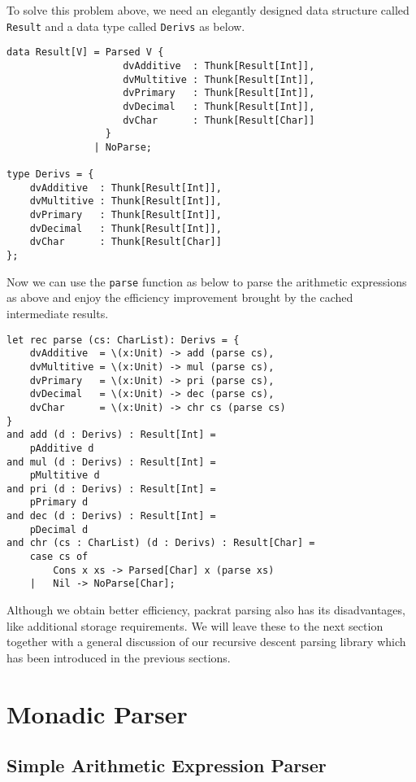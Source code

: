 To solve this problem above, we need an elegantly designed data structure called \texttt{Result} and a data type called \texttt{Derivs} as below.
\begin{lstlisting}
data Result[V] = Parsed V {
                    dvAdditive  : Thunk[Result[Int]],
                    dvMultitive : Thunk[Result[Int]],
                    dvPrimary   : Thunk[Result[Int]],
                    dvDecimal   : Thunk[Result[Int]],
                    dvChar      : Thunk[Result[Char]]
                 }
               | NoParse;

type Derivs = {
    dvAdditive  : Thunk[Result[Int]],
    dvMultitive : Thunk[Result[Int]],
    dvPrimary   : Thunk[Result[Int]],
    dvDecimal   : Thunk[Result[Int]],
    dvChar      : Thunk[Result[Char]]
};
\end{lstlisting}
Now we can use the \texttt{parse} function as below to parse the arithmetic expressions as above and enjoy the efficiency improvement brought by the cached intermediate results.
\begin{lstlisting}
let rec parse (cs: CharList): Derivs = {
    dvAdditive  = \(x:Unit) -> add (parse cs),
    dvMultitive = \(x:Unit) -> mul (parse cs),
    dvPrimary   = \(x:Unit) -> pri (parse cs),
    dvDecimal   = \(x:Unit) -> dec (parse cs),
    dvChar      = \(x:Unit) -> chr cs (parse cs)
}
and add (d : Derivs) : Result[Int] =
    pAdditive d
and mul (d : Derivs) : Result[Int] =
    pMultitive d
and pri (d : Derivs) : Result[Int] =
    pPrimary d
and dec (d : Derivs) : Result[Int] =
    pDecimal d
and chr (cs : CharList) (d : Derivs) : Result[Char] =
    case cs of
        Cons x xs -> Parsed[Char] x (parse xs)
    |   Nil -> NoParse[Char];
\end{lstlisting}
Although we obtain better efficiency, packrat parsing also has its disadvantages, like additional storage requirements. We will leave these to the next section together with a general discussion of our recursive descent parsing library which has been introduced in the previous sections.

\section{Monadic Parser}

\subsection{Simple Arithmetic Expression Parser} \label{section:simple_arith_expr_parser}

